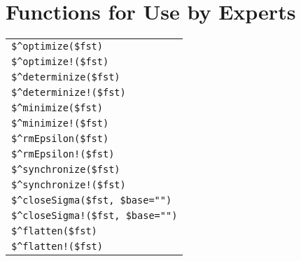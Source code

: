 \section{Functions for Use by Experts}

\begin{tabular}{|l|}
\hline
\verb!$^optimize($fst)! \\
\verb/$^optimize!($fst)/ \\
\verb!$^determinize($fst)! \\
\verb/$^determinize!($fst)/ \\
\verb!$^minimize($fst)! \\
\verb/$^minimize!($fst)/ \\
\verb!$^rmEpsilon($fst)! \\
\verb/$^rmEpsilon!($fst)/ \\
\verb!$^synchronize($fst)! \\
\verb/$^synchronize!($fst)/ \\
\hline
\verb/$^closeSigma($fst, $base="")/\\
\verb/$^closeSigma!($fst, $base="")/\\
\hline
\verb/$^flatten($fst)/\\
\verb/$^flatten!($fst)/\\
\hline
\end{tabular}

